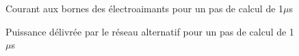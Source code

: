 \begin{figure}[htb]
\centering
{}
\caption{Courant aux bornes des électroaimants pour un pas de calcul de 1$\mu$s}
\label{AF_DC_CHA1}
\end{figure}

\begin{figure}[htb]
\centering
{}
\caption{Puissance délivrée par le réseau alternatif pour un pas de calcul de 1$\mu$s}
\label{AF_DC_CHA2}
\end{figure}




